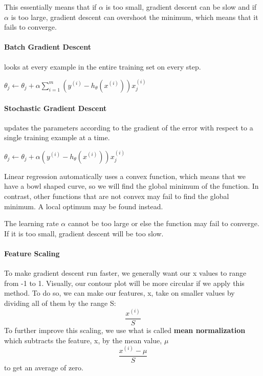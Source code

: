 \documentclass{article}
\begin{document}
This essentially means that if $\alpha$ is too small, gradient descent can be slow and if $\alpha$ is too large, gradient descent can overshoot the minimum, which means that it fails to converge.

\paragraph{Batch Gradient Descent} looks at every example in the entire training set on every step. 
\begin{algorithmic}
\Repeat 
	\State $\theta_j \gets \theta_j + \alpha \sum_{i=1}^{m}\left(y^{(i)} - h_\theta(x^{(i)})\right)x_j^{(i)}$
\end{algorithmic}

\paragraph{Stochastic Gradient Descent} updates the parameters according to the gradient of the error with respect to a single training example at a time.
\begin{algorithmic}
\Loop
		\State $\theta_j \gets \theta_j + \alpha \left(y^{(i)} - h_\theta(x^{(i)})\right)x_j^{(i)}$
	\EndFor
\EndLoop
\end{algorithmic}

Linear regression automatically uses a convex function, which means that we have a bowl shaped curve, so we will find the global minimum of the function. In contrast, other functions that are not convex may fail to find the global minimum. A local optimum may be found instead. 

The learning rate $\alpha$ cannot be too large or else the function may fail to converge. If it is too small, gradient descent will be too slow.

\paragraph{Feature Scaling}
To make gradient descent run faster, we generally want our x values to range from -1 to 1. Visually, our contour plot will be more circular if we apply this method. To do so, we can make our features, x, take on smaller values by dividing all of them by the range S:
$$
   \frac{x^{\left( i \right)}}{ S}
$$
To further improve this scaling, we use what is called {\bf mean normalization} which subtracts the feature, x, by the mean value, $\mu$ 
$$
   \frac{x^{\left( i \right)} - \mu}{ S}
$$
to get an average of zero.
\end{document}
